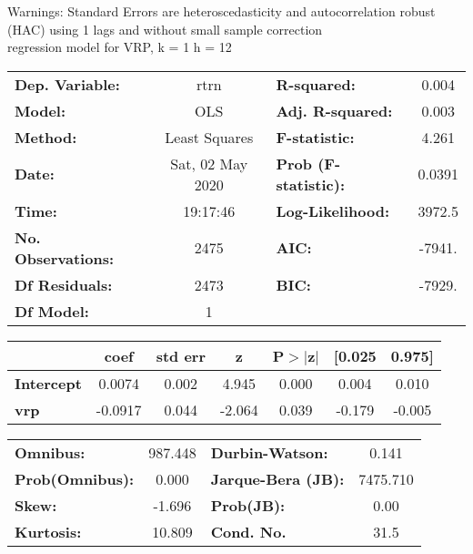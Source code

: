 Warnings: \newline
 [1] Standard Errors are heteroscedasticity and autocorrelation robust (HAC) using 1 lags and without small sample correction\\ 

regression model for VRP, k = 1 h = 12\begin{center}
\begin{tabular}{lclc}
\toprule
\textbf{Dep. Variable:}    &       rtrn       & \textbf{  R-squared:         } &     0.004   \\
\textbf{Model:}            &       OLS        & \textbf{  Adj. R-squared:    } &     0.003   \\
\textbf{Method:}           &  Least Squares   & \textbf{  F-statistic:       } &     4.261   \\
\textbf{Date:}             & Sat, 02 May 2020 & \textbf{  Prob (F-statistic):} &   0.0391    \\
\textbf{Time:}             &     19:17:46     & \textbf{  Log-Likelihood:    } &    3972.5   \\
\textbf{No. Observations:} &        2475      & \textbf{  AIC:               } &    -7941.   \\
\textbf{Df Residuals:}     &        2473      & \textbf{  BIC:               } &    -7929.   \\
\textbf{Df Model:}         &           1      & \textbf{                     } &             \\
\bottomrule
\end{tabular}
\begin{tabular}{lcccccc}
                   & \textbf{coef} & \textbf{std err} & \textbf{z} & \textbf{P$> |$z$|$} & \textbf{[0.025} & \textbf{0.975]}  \\
\midrule
\textbf{Intercept} &       0.0074  &        0.002     &     4.945  &         0.000        &        0.004    &        0.010     \\
\textbf{vrp}       &      -0.0917  &        0.044     &    -2.064  &         0.039        &       -0.179    &       -0.005     \\
\bottomrule
\end{tabular}
\begin{tabular}{lclc}
\textbf{Omnibus:}       & 987.448 & \textbf{  Durbin-Watson:     } &    0.141  \\
\textbf{Prob(Omnibus):} &   0.000 & \textbf{  Jarque-Bera (JB):  } & 7475.710  \\
\textbf{Skew:}          &  -1.696 & \textbf{  Prob(JB):          } &     0.00  \\
\textbf{Kurtosis:}      &  10.809 & \textbf{  Cond. No.          } &     31.5  \\
\bottomrule
\end{tabular}
\end{center}

